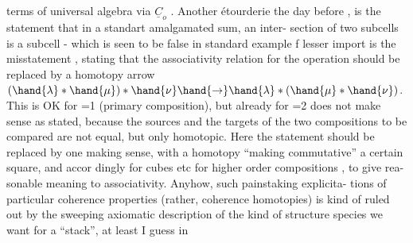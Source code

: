 terms of universal algebra via $\underline{C}_o$ . Another étourderie the day before\hand{,}
 , is the statement that in a standart amalgamated sum, an inter-%
section of two  subcells is a subcell - which is seen to be false in
  standard example \hand{\unsure{$\ell$}} f lesser import is the misstatement  ,
stating that the associativity relation for the operation \hand{$*_\ell$} should be
 replaced by a homotopy arrow
$(\hand{\lambda}*\hand{\mu})*\hand{\nu} \hand{\to} \hand{\lambda}*(\hand{\mu}*\hand{\nu})$. This is OK for \hand{$\ell$}=1 (primary composition), but
already for \hand{$\ell$}=2 does not make sense as stated, because the sources and
the targets of the two compositions to be compared are not equal, but
only homotopic. Here the statement should be replaced by one making
sense, with a homotopy ``making commutative'' a certain square, and accor%
dingly for cubes etc for higher order compositions \hand{$\lambda *_\ell \mu$}, to give rea-%
sonable meaning to associativity. Anyhow, such painstaking explicita-%
tions of particular coherence properties (rather, coherence homotopies)
is kind of ruled out by the sweeping axiomatic description of the
kind of structure species we want for a ``stack'', at least\hand{,} I guess\hand{,} in

